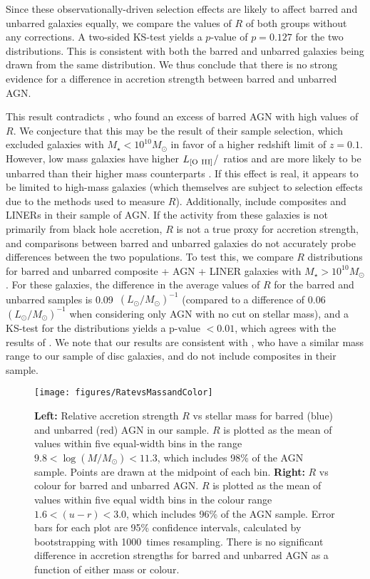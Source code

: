Since these observationally-driven selection effects are likely to affect barred and unbarred galaxies equally, we compare the values of $R$ of both groups without any corrections. A two-sided KS-test yields a $p$-value of $p=0.127$ for the two distributions. This is consistent with both the barred and unbarred galaxies being drawn from the same distribution. We thus conclude that there is no strong evidence for a difference in accretion strength between barred and unbarred AGN.  

This result contradicts \citet{Alonso2013}, who found an excess of barred AGN with high values of $R$. We conjecture that this may be the result of their sample selection, which excluded galaxies with $M_\star<10^{10}M_\odot$ in favor of a higher redshift limit of $z=0.1$. However, low mass galaxies have higher $L_{\rm{[O~III]}}$/\mbh~ratios and are more likely to be unbarred than their higher mass counterparts \citep{Lee2012}. If this effect is real, it appears to be limited to high-mass galaxies (which themselves are subject to selection effects due to the methods used to measure $R$). Additionally, \citet{Alonso2013} include composites and LINERs in their sample of AGN. If the activity from these galaxies is not primarily from black hole accretion, $R$ is not a true proxy for accretion strength, and comparisons between barred and unbarred galaxies do not accurately probe differences between the two populations. To test this, we compare $R$ distributions for barred and unbarred composite + AGN + LINER galaxies with $M_\star>10^{10}M_\odot$. For these galaxies, the difference in the average values of $R$ for the barred and unbarred samples is 0.09~$(L_\odot/M_\odot)^{-1}$ (compared to a difference of 0.06~$(L_\odot/M_\odot)^{-1}$ when considering only AGN with no cut on stellar mass), and a KS-test for the distributions yields a p-value $<0.01$, which agrees with the results of \citet{Alonso2013}. We note that our results are consistent with \citet{Lee2012}, who have a similar mass range to our sample of disc galaxies, and do not include composites in their sample.

\begin{figure*}
\texttt{[image: figures/RatevsMassandColor]}
\caption{\textbf{Left:} Relative accretion strength $R$ vs stellar mass for barred (blue) and unbarred (red) AGN in our sample. $R$ is plotted as the mean of values within five equal-width bins in the range $9.8<\log(M/M_{\odot})<11.3$, which includes 98\% of the AGN sample. Points are drawn at the midpoint of each bin. \textbf{Right:} $R$ vs colour for barred and unbarred AGN. $R$ is plotted as the mean of values within five equal width bins in the colour range $1.6<(u-r)<3.0$, which includes 96\% of the AGN sample. Error bars for each plot are 95\% confidence intervals, calculated by bootstrapping with 1000~times resampling. There is no significant difference in accretion strengths for barred and unbarred AGN as a function of either mass or colour.}
\label{Rate}
\end{figure*}

